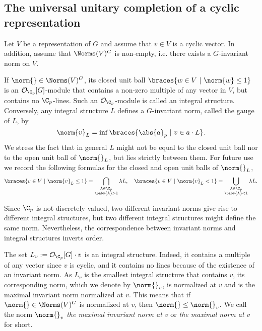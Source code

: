 \subsection{The universal unitary completion of a cyclic representation}
Let $V$ be a representation of $G$ and assume that $v\in V$ is a cyclic vector.
In addition, assume that $\Norms(V)^G$ is non-empty, i.e. there exists a $G$-invariant norm on $V$.

If $\norm{}\in \Norms(V)^G$, its closed unit ball $\braces{w\in V\ |\ \norm{w}\leq 1}$ is an $\mathcal{O}_{\C_p}[G]$-module that contains a non-zero multiple of any vector in $V$, but contains no $\C_p$-lines.
Such an $\mathcal{O}_{\C_p}$-module is called an integral structure.
Conversely, any integral structure $L$ defines a $G$-invariant norm, called the gauge of $L$, by
\[\norm{v}_L=\inf\braces{\abs{a}_p\ |\ v\in a\cdot L}.\]
We stress the fact that in general $L$ might not be equal to the closed unit ball nor to the open unit ball of $\norm{}_L$, but lies strictly between them.
 For future use we record the following formulas for the closed and open unit balls of $\norm{}_L$,
    \begin{equation}\label{equation_close_open_unit_balls}
    \braces{v\in V\ |\ \norm{v}_L\leq 1}=\bigcap_{\substack{\lambda\in \C_p\\ \pabs{\lambda}>1}}\lambda L,\ \ \ 
    \braces{v\in V\ |\ \norm{v}_L< 1}=\bigcup_{\substack{\lambda\in \C_p\\ \pabs{\lambda}<1}}\lambda L.  
    \end{equation} 

Since $\C_p$ is not discretely valued, two different invariant norms give rise to different integral structures, but two different integral structures might define the same norm.
Nevertheless, the correspondence between invariant norms and integral structures inverts order.


The set $L_{v}:=\mathcal{O}_{\C_p}[G]\cdot v$ is an integral structure.
Indeed, it contains a multiple of any vector since $v$ is cyclic, and it contains no lines because of the existence of an invariant norm.
As $L_v$ is the smallest integral structure that contains $v$,
its corresponding norm, which we denote by $\norm{}_v$, is normalized at $v$ and is the maximal invariant norm normalized at $v$.
This means that if $\norm{}\in\Norms(V)^G$ is normalized at $v$, then $\norm{}\leq \norm{}_v$.
We call the norm $\norm{}_{v}$ \textit{the maximal invariant norm at $v$} or \textit{the maximal norm at $v$} for short.

